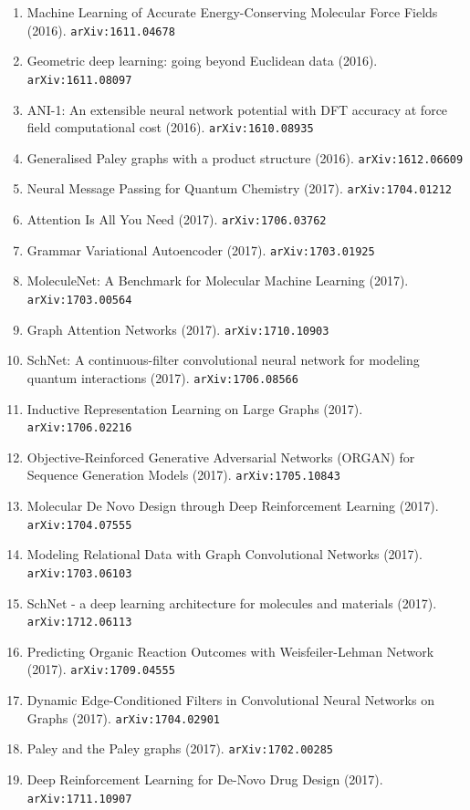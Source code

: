 \documentclass[11pt]{article}
\begin{document}
\begin{enumerate}
  \item Machine Learning of Accurate Energy-Conserving Molecular Force Fields (2016). \texttt{arXiv:1611.04678}
  \item Geometric deep learning: going beyond Euclidean data (2016). \texttt{arXiv:1611.08097}
  \item ANI-1: An extensible neural network potential with DFT accuracy at force
  field computational cost (2016). \texttt{arXiv:1610.08935}
  \item Generalised Paley graphs with a product structure (2016). \texttt{arXiv:1612.06609}
  \item Neural Message Passing for Quantum Chemistry (2017). \texttt{arXiv:1704.01212}
  \item Attention Is All You Need (2017). \texttt{arXiv:1706.03762}
  \item Grammar Variational Autoencoder (2017). \texttt{arXiv:1703.01925}
  \item MoleculeNet: A Benchmark for Molecular Machine Learning (2017). \texttt{arXiv:1703.00564}
  \item Graph Attention Networks (2017). \texttt{arXiv:1710.10903}
  \item SchNet: A continuous-filter convolutional neural network for modeling
  quantum interactions (2017). \texttt{arXiv:1706.08566}
  \item Inductive Representation Learning on Large Graphs (2017). \texttt{arXiv:1706.02216}
  \item Objective-Reinforced Generative Adversarial Networks (ORGAN) for
  Sequence Generation Models (2017). \texttt{arXiv:1705.10843}
  \item Molecular De Novo Design through Deep Reinforcement Learning (2017). \texttt{arXiv:1704.07555}
  \item Modeling Relational Data with Graph Convolutional Networks (2017). \texttt{arXiv:1703.06103}
  \item SchNet - a deep learning architecture for molecules and materials (2017). \texttt{arXiv:1712.06113}
  \item Predicting Organic Reaction Outcomes with Weisfeiler-Lehman Network (2017). \texttt{arXiv:1709.04555}
  \item Dynamic Edge-Conditioned Filters in Convolutional Neural Networks on
  Graphs (2017). \texttt{arXiv:1704.02901}
  \item Paley and the Paley graphs (2017). \texttt{arXiv:1702.00285}
  \item Deep Reinforcement Learning for De-Novo Drug Design (2017). \texttt{arXiv:1711.10907}

\end{enumerate}
\end{document}
